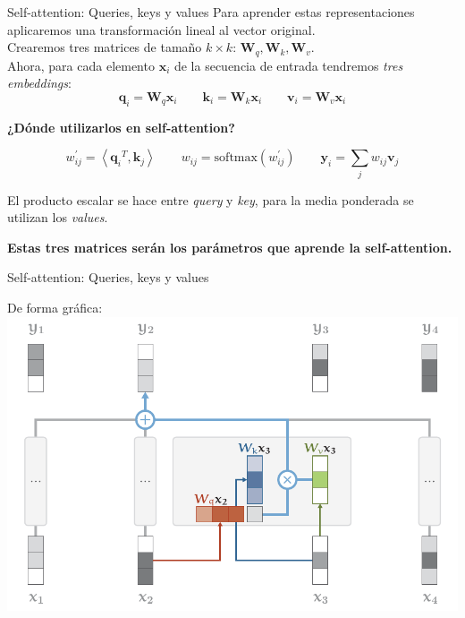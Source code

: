 \documentclass[aspectratio=169]{beamer}
\newenvironment{blockm}[1]{%
  \begin{block}{\textbf{#1}}%
  }{%
  \end{block}%
  \vspace{1em}%
}
\begin{document}
\begin{frame}{Self-attention: Queries, keys y values}
  Para aprender estas representaciones aplicaremos una transformación lineal al vector original.\\
  \vspace{.1cm}
  Crearemos tres matrices de tamaño $k \times k$: $\mathbf{W}_{q}, \mathbf{W}_{k}, \mathbf{W}_{v}$.\\
  \vspace{.1cm}
  Ahora, para cada elemento $\mathbf{x}_{i}$ de la secuencia de entrada tendremos \emph{tres embeddings}:
  \begin{equation*}
    \mathbf{q}_{i} = \mathbf{W}_{q}\mathbf{x}_{i} \quad \quad
    \mathbf{k}_{i} = \mathbf{W}_{k}\mathbf{x}_{i} \quad \quad
    \mathbf{v}_{i} = \mathbf{W}_{v}\mathbf{x}_{i}
  \end{equation*}

  \begin{blockm}{¿Dónde utilizarlos en self-attention?}
    \begin{equation*}
      w^{'}_{ij} = \left \langle {\mathbf{q}_{i}}^{T}, \mathbf{k}_{j} \right \rangle \quad \quad
      w_{ij} = \text{softmax}(w^{'}_{ij}) \quad \quad
      \mathbf{y}_{i} = \sum_{j} w_{ij} \mathbf{v}_{j}     
    \end{equation*}
\end{blockm}
El producto escalar se hace entre \emph{query} y \emph{key}, para la media ponderada se utilizan los \emph{values}.
\begin{block}{}
  \centering
  \textbf{Estas tres matrices serán los parámetros que aprende la self-attention.}
\end{block}
\end{frame}

\begin{frame}{Self-attention: Queries, keys y values}

  De forma gráfica:\\
  \vspace{.3cm}
  \includegraphics[width=.65\textwidth, center]{imgs/tema4/att/SAT_qkv.pdf}

\end{frame}
\end{document}
